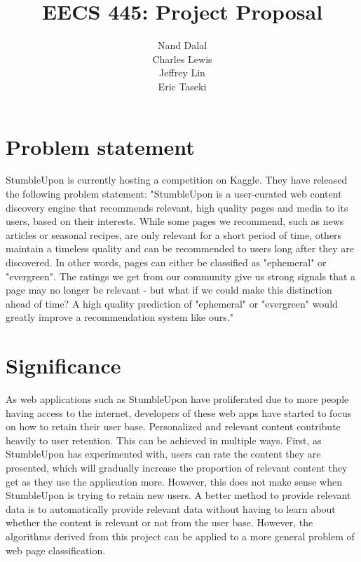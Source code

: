 \documentclass[11pt]{amsart}
\title{EECS 445: Project Proposal}
\author{Nand Dalal
\\Charles Lewis
\\Jeffrey Lin
\\Eric Taseki}
\begin{document}
\maketitle



\section{Problem statement}
StumbleUpon is currently hosting a competition on Kaggle. They have released the following problem statement: "StumbleUpon is a user-curated web content discovery engine that recommends relevant, high quality pages and media to its users, based on their interests. While some pages we recommend, such as news articles or seasonal recipes, are only relevant for a short period of time, others maintain a timeless quality and can be recommended to users long after they are discovered. In other words, pages can either be classified as "ephemeral" or "evergreen". The ratings we get from our community give us strong signals that a page may no longer be relevant - but what if we could make this distinction ahead of time? A high quality prediction of "ephemeral" or "evergreen" would greatly improve a recommendation system like ours."

\section{Significance}
As web applications such as StumbleUpon have proliferated due to more people having access to the internet, developers of these web apps have started to focus on how to retain their user base. Personalized and relevant content contribute heavily to user retention. This can be achieved in multiple ways. First, as StumbleUpon has experimented with, users can rate the content they are presented, which will gradually increase the proportion of relevant content they get as they use the application more. However, this does not make sense when StumbleUpon is trying to retain new users. A better method to provide relevant data is to automatically provide relevant data without having to learn about whether the content is relevant or not from the user base. However, the algorithms derived from this project can be applied to a more general problem of web page classification.
\end{document}
